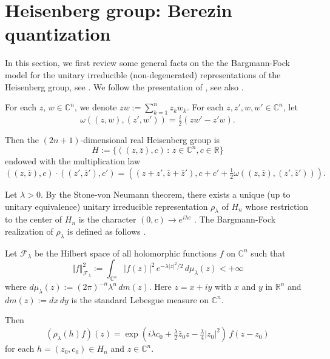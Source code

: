 \documentclass[12pt]{amsart}
\numberwithin{equation}{section}
\begin{document}
\section{Heisenberg group: Berezin quantization} \label{sec:2}

In this section, we first review some general facts on the
the Bargmann-Fock
model for the unitary irreducible (non-degenerated)
representations of the Heisenberg group, see \cite{Fo}. We  follow the presentation
of \cite{CaTo}, see also \cite{CaTs} .

For each $z,\,w \in {\mathbb C}^{n}$, we denote $zw:=\sum_{k=1}^nz_kw_k$. For each $z, z',w,w'\in {\mathbb C}^{n}$, let
\begin{equation*}\omega
((z,w),(z',w'))=\tfrac{i}{2}(zw'-z'w).
\end{equation*}

Then the $(2n+1)$-dimensional real Heisenberg group is $$H:=\{((z,{\bar
z}),c)\,:\,z\in {\mathbb C}^n, c\in {\mathbb R}\}$$ endowed with the
multiplication law
\begin{equation*}((z,{\bar
z}),c)\cdot ((z',{\bar z'}),c')=((z+z',{\bar z}+{\bar
z'}),c+c'+\tfrac{1}{2}\omega ((z,{\bar z}),(z',{\bar
z'}))).\end{equation*} 


Let $\lambda>0$. By the Stone-von Neumann
theorem, there exists a unique (up to unitary equivalence) unitary
irreducible representation $\rho_{\lambda}$ of $H_n$ whose restriction to the center
of $H_n$ is the character $(0,c)\rightarrow e^{i\lambda c}$
\cite{Tay}. 
The Bargmann-Fock realization of $\rho_{\lambda}$ is defined as follows \cite{Barg}. 

Let ${\mathcal F}_{\lambda}$ be the Hilbert space of all holomorphic functions $f$
on ${\mathbb C}^n$ such that \begin{equation*}\Vert f\Vert^2_{{\mathcal F}_{\lambda}}
:=\int_{{\mathbb C}^n} \vert f(z)\vert^2\, e^{-\lambda \vert
z\vert^2/2}\,d\mu_{\lambda} (z) <+\infty\end{equation*} where
 $d\mu_{\lambda}(z):=(2\pi
)^{-n}{\lambda}^n\,dm(z)$. Here $z=x+iy$ with $x$ and $y$ in ${\mathbb
R}^n$ and $dm(z):= dx\,dy$ is the standard Lebesgue measure on ${\mathbb
C}^n$.

Then 
\begin{equation*}({\rho}_{\lambda}(h)f)(z)=\exp \left(i\lambda c_0+\tfrac{\lambda}{2}{\bar z_0}z-\tfrac{\lambda}{4}\vert z_0\vert^2\right)\,f(z- z_0) \end{equation*}
for each $h=(z_0, c_0)\in H_n$ and $z\in {\mathbb C}^n$.
\end{document}
